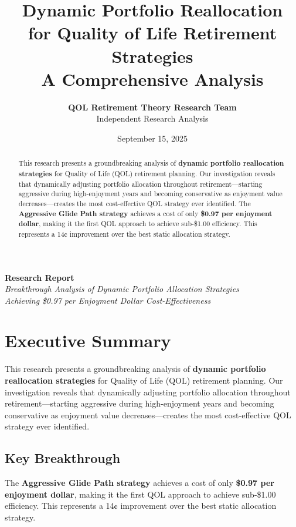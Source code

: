\documentclass[11pt,letterpaper]{article}
\title{
    \vspace{-2cm}
    \Huge\textbf{\color{primary}Dynamic Portfolio Reallocation}\\
    \vspace{0.5cm}
    \LARGE\textbf{\color{secondary}for Quality of Life Retirement Strategies}\\
    \vspace{0.3cm}
    \Large A Comprehensive Analysis
}
\author{
    \textbf{QOL Retirement Theory Research Team}\\
    Independent Research Analysis
}
\date{September 15, 2025}
\begin{document}
\maketitle
\thispagestyle{empty}

\vfill
\begin{center}
\large
\textbf{Research Report}\\
\vspace{0.5cm}
\textit{Breakthrough Analysis of Dynamic Portfolio Allocation Strategies}\\
\textit{Achieving \$0.97 per Enjoyment Dollar Cost-Effectiveness}
\end{center}
\vfill

\newpage

\begin{abstract}
\noindent This research presents a groundbreaking analysis of \textbf{dynamic portfolio reallocation strategies} for Quality of Life (QOL) retirement planning. Our investigation reveals that dynamically adjusting portfolio allocation throughout retirement—starting aggressive during high-enjoyment years and becoming conservative as enjoyment value decreases—creates the most cost-effective QOL strategy ever identified. The \textbf{Aggressive Glide Path strategy} achieves a cost of only \textbf{\$0.97 per enjoyment dollar}, making it the first QOL approach to achieve sub-\$1.00 efficiency. This represents a 14¢ improvement over the best static allocation strategy.
\end{abstract}

\tableofcontents
\newpage

\section{Executive Summary}

This research presents a groundbreaking analysis of \textbf{dynamic portfolio reallocation strategies} for Quality of Life (QOL) retirement planning. Our investigation reveals that dynamically adjusting portfolio allocation throughout retirement—starting aggressive during high-enjoyment years and becoming conservative as enjoyment value decreases—creates the most cost-effective QOL strategy ever identified.

\subsection{Key Breakthrough}
The \textbf{Aggressive Glide Path strategy} achieves a cost of only \textbf{\$0.97 per enjoyment dollar}, making it the first QOL approach to achieve sub-\$1.00 efficiency. This represents a 14¢ improvement over the best static allocation strategy.
\end{document}
